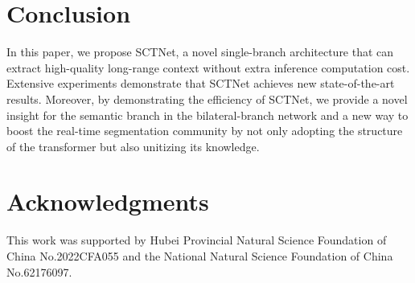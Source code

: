 \documentclass[letterpaper]{article} %
\begin{document}
\section{Conclusion}
In this paper, we propose SCTNet, a novel single-branch architecture that can extract high-quality long-range context without extra inference computation cost. Extensive experiments demonstrate that SCTNet achieves new state-of-the-art results. Moreover, by demonstrating the efficiency of SCTNet, we provide a novel insight for the semantic branch in the bilateral-branch network and a new way to boost the real-time segmentation community by not only adopting the structure of the transformer but also unitizing its knowledge.

\section{Acknowledgments}
This work was supported by Hubei Provincial Natural Science Foundation of China No.2022CFA055 and the National Natural Science Foundation of China No.62176097.
\end{document}
